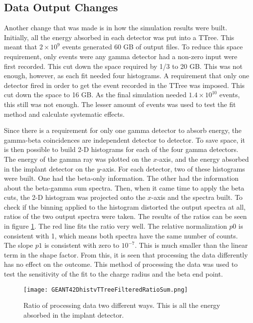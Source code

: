 \documentclass[../MaxHughesThesis.tex]{subfiles}
\begin{document}
\subsection{Data Output Changes}
Another change that was made is in how the simulation results were built.
Initially, all the energy absorbed in each detector was put into a TTree.
This meant that $2 \times 10^{9}$ events generated 60 GB of output files.
To reduce this space requirement, only events were any gamma detector had a non-zero input were first recorded.
This cut down the space required by 1/3 to 20 GB.
This was not enough, however, as each fit needed four histograms.
A requirement that only one detector fired in order to get the event recorded in the TTree was imposed. 
This cut down the space to 16 GB.
As the final simulation needed $1.4 \times 10^{10}$ events, this still was not enough.
The lesser amount of events was used to test the fit method and calculate systematic effects.

Since there is a requirement for only one gamma detector to absorb energy, the gamma-beta coincidences are independent detector to detector.
To save space, it is then possible to build 2-D histograms for each of the four gamma detectors.
The energy of the gamma ray was plotted on the $x$-axis, and the energy absorbed in the implant detector on the $y$-axis. 
For each detector, two of these histograms were built.
One had the beta-only information.
The other had the information about the beta-gamma sum spectra.
Then, when it came time to apply the beta cuts, the 2-D histogram was projected onto the $x$-axis and the spectra built.
To check if the binning applied to the histogram distorted the output spectra at all, ratios of the two output spectra were taken.
The results of the ratios can be seen in figure \ref{fig:histogramtottreeratio}.
The red line fits the ratio very well.
The relative normalization $\mathit{p0}$ is consistent with 1, which means both spectra have the same number of counts. 
The slope $\mathit{p1}$ is consistent with zero to $10^{-7}$.
This is much smaller than the linear term in the shape factor.
From this, it is seen that processing the data differently has no effect on the outcome.
This method of processing the data was used to test the sensitivity of the fit to the charge radius and the beta end point.

\begin{figure}
    \centerline{\texttt{[image: GEANT42DhistvTTreeFilteredRatioSum.png]}}
    \caption{Ratio of processing data two different ways.
    	     This is all the energy absorbed in the implant detector.}
    \label{fig:histogramtottreeratio}
\end{figure}
\end{document}
